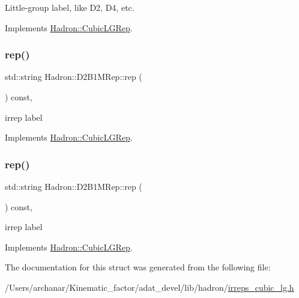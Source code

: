 Little-\/group label, like D2, D4, etc. 

Implements \mbox{\hyperlink{structHadron_1_1CubicLGRep_a9bdb14b519a611d21379ed96a3a9eb41}{Hadron\+::\+Cubic\+L\+G\+Rep}}.

\mbox{\label{structHadron_1_1D2B1MRep_acdc6dd62590a2ab336e6f7669c63ed3f}} 
\subsubsection{\texorpdfstring{rep()}{rep()}\hspace{0.1cm}{\footnotesize\ttfamily [1/2]}}
{\footnotesize\ttfamily std\+::string Hadron\+::\+D2\+B1\+M\+Rep\+::rep (\begin{DoxyParamCaption}{ }\end{DoxyParamCaption}) const\hspace{0.3cm}{\ttfamily [inline]}, {\ttfamily [virtual]}}

irrep label 

Implements \mbox{\hyperlink{structHadron_1_1CubicLGRep_a50f5ddbb8f4be4cee0106fa9e8c75e6c}{Hadron\+::\+Cubic\+L\+G\+Rep}}.

\mbox{\label{structHadron_1_1D2B1MRep_acdc6dd62590a2ab336e6f7669c63ed3f}} 
\subsubsection{\texorpdfstring{rep()}{rep()}\hspace{0.1cm}{\footnotesize\ttfamily [2/2]}}
{\footnotesize\ttfamily std\+::string Hadron\+::\+D2\+B1\+M\+Rep\+::rep (\begin{DoxyParamCaption}{ }\end{DoxyParamCaption}) const\hspace{0.3cm}{\ttfamily [inline]}, {\ttfamily [virtual]}}

irrep label 

Implements \mbox{\hyperlink{structHadron_1_1CubicLGRep_a50f5ddbb8f4be4cee0106fa9e8c75e6c}{Hadron\+::\+Cubic\+L\+G\+Rep}}.



The documentation for this struct was generated from the following file\+:\begin{DoxyCompactItemize}
\item 
/\+Users/archanar/\+Kinematic\+\_\+factor/adat\+\_\+devel/lib/hadron/\mbox{\hyperlink{lib_2hadron_2irreps__cubic__lg_8h}{irreps\+\_\+cubic\+\_\+lg.\+h}}\end{DoxyCompactItemize}
